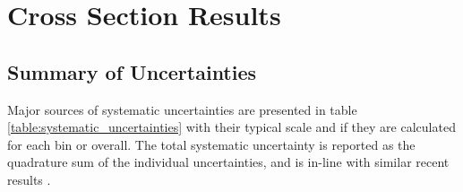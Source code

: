 \section{Cross Section Results}\label{sec:Ch5_raw_results}
    \subsection{Summary of Uncertainties}
        Major sources of systematic uncertainties are presented in table \ref{table:systematic_uncertainties} with their typical scale and if they are calculated for each bin or overall. The total systematic uncertainty is reported as the quadrature sum of the individual uncertainties, and is in-line with similar recent results \parencite{Lee2022MeasurementDetector}.

